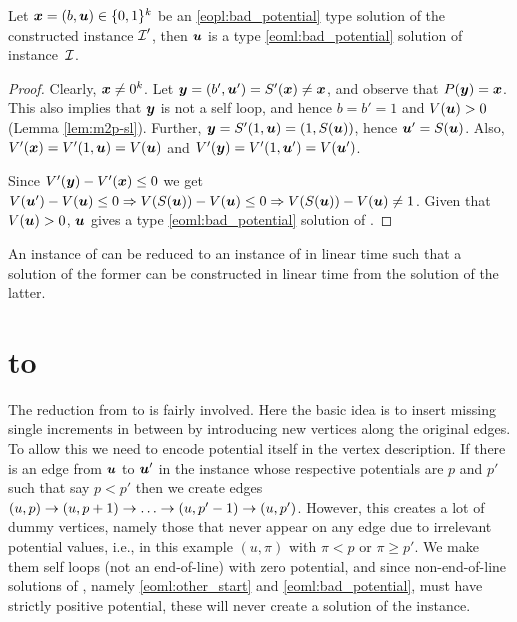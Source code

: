 \begin{lemma}\label{lem:m2p-r2}
Let $\mbox{\boldmath $x$}=(b,\mbox{\boldmath $u$})\in \{0,1\}^k$ be an \ref{eopl:bad_potential} type solution of the constructed \EOPL instance $\mbox{${\mathcal I}$}'$, then $\mbox{\boldmath $u$}$ is a type \ref{eoml:bad_potential} solution of \EOML instance~$\mbox{${\mathcal I}$}$.
\end{lemma}
\begin{proof}
Clearly, $\mbox{\boldmath $x$}\neq 0^k$. Let $\mbox{\boldmath $y$} = (b',\mbox{\boldmath $u$}') = S'(\mbox{\boldmath $x$}) \neq \mbox{\boldmath $x$}$, and observe that $P(\mbox{\boldmath $y$}) = \mbox{\boldmath $x$}$. This also implies that $\mbox{\boldmath $y$}$ is not a self loop, and hence $b=b'=1$ and $V(\mbox{\boldmath $u$})>0$ (Lemma \ref{lem:m2p-sl}). Further, $\mbox{\boldmath $y$} = S'(1,\mbox{\boldmath $u$})=(1,S(\mbox{\boldmath $u$}))$, hence $\mbox{\boldmath $u$}'=S(\mbox{\boldmath $u$})$. Also, $V'(\mbox{\boldmath $x$})=V'(1,\mbox{\boldmath $u$})=V(\mbox{\boldmath $u$})$ and $V'(\mbox{\boldmath $y$})=V'(1,\mbox{\boldmath $u$}')=V(\mbox{\boldmath $u$}')$. 

Since $V'(\mbox{\boldmath $y$})-V'(\mbox{\boldmath $x$})\le 0$ we get $V(\mbox{\boldmath $u$}')-V(\mbox{\boldmath $u$})\le 0 \Rightarrow V(S(\mbox{\boldmath $u$})) - V(\mbox{\boldmath $u$}) \le 0\Rightarrow V(S(\mbox{\boldmath $u$})) - V(\mbox{\boldmath $u$})\neq 1$. Given that $V(\mbox{\boldmath $u$})>0$, $\mbox{\boldmath $u$}$ gives a type \ref{eoml:bad_potential} solution of \EOML.
\end{proof}

\begin{theorem}\label{thm:m2p}
An instance of \EOML can be reduced to an instance of \EOPL in linear time such that a solution of the former can be constructed in linear time from the solution of the latter. 
\end{theorem}

\section{\EOPL to \EOML}
\label{sec:eopl2eoml}

The reduction from \EOPL to \EOML is fairly involved. Here the basic idea is to insert missing single
increments in between by introducing new vertices along the original edges. To
allow this we need to encode potential itself in the vertex description. If
there is an edge from $\mbox{\boldmath $u$}$ to $\mbox{\boldmath $u$}'$ in the \EOPL instance whose respective
potentials are $p$ and $p'$ such that say $p<p'$ then we create edges $(u,p)\ra
(u,p+1)\ra \dots \ra (u,p'-1)\ra (u,p')$. However, this creates a lot of dummy
vertices, namely those that never appear on any edge due to irrelevant potential
values, i.e., in this example $(u,\pi)$ with $\pi <p$ or $\pi\ge p'$. We make
them self loops (not an end-of-line) with zero potential, and since
non-end-of-line solutions of \EOML, namely \ref{eoml:other_start} and \ref{eoml:bad_potential}, must have strictly
positive potential, these will never create a solution of the \EOML instance.

